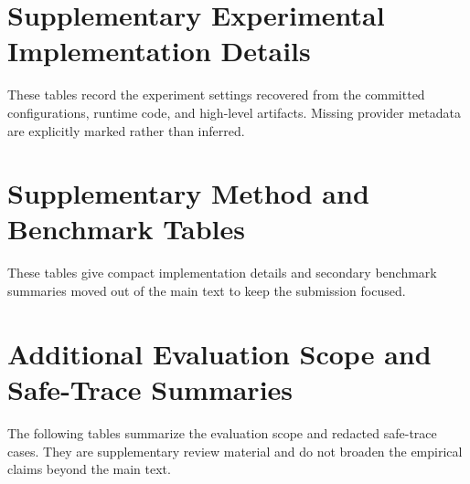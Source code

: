 \documentclass{llncs}
\begin{document}
\section{Supplementary Experimental Implementation Details}
\label{app:expdetails}
These tables record the experiment settings recovered from the committed configurations, runtime code, and high-level artifacts. Missing provider metadata are explicitly marked rather than inferred.

\FloatBarrier

\FloatBarrier

\FloatBarrier

\FloatBarrier

\FloatBarrier

\FloatBarrier

\FloatBarrier

\FloatBarrier

\section{Supplementary Method and Benchmark Tables}
\label{app:details}
These tables give compact implementation details and secondary benchmark summaries moved out of the main text to keep the submission focused.

\FloatBarrier

\FloatBarrier

\FloatBarrier

\FloatBarrier

\FloatBarrier

\FloatBarrier

\FloatBarrier

\section{Additional Evaluation Scope and Safe-Trace Summaries}
\label{app:evidence}
The following tables summarize the evaluation scope and redacted safe-trace cases. They are supplementary review material and do not broaden the empirical claims beyond the main text.

\FloatBarrier

\end{document}
